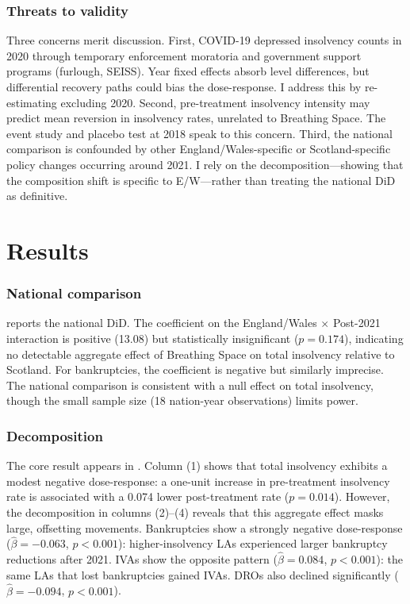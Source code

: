 \documentclass[12pt]{article}
\begin{document}
\subsubsection*{Threats to validity} Three concerns merit discussion. First, COVID-19 depressed insolvency counts in 2020 through temporary enforcement moratoria and government support programs (furlough, SEISS). Year fixed effects absorb level differences, but differential recovery paths could bias the dose-response. I address this by re-estimating excluding 2020. Second, pre-treatment insolvency intensity may predict mean reversion in insolvency rates, unrelated to Breathing Space. The event study and placebo test at 2018 speak to this concern. Third, the national comparison is confounded by other England/Wales-specific or Scotland-specific policy changes occurring around 2021. I rely on the decomposition---showing that the composition shift is specific to E/W---rather than treating the national DiD as definitive.

\section{Results}



\subsubsection*{National comparison}  reports the national DiD. The coefficient on the England/Wales $\times$ Post-2021 interaction is positive (13.08) but statistically insignificant ($p = 0.174$), indicating no detectable aggregate effect of Breathing Space on total insolvency relative to Scotland. For bankruptcies, the coefficient is negative but similarly imprecise. The national comparison is consistent with a null effect on total insolvency, though the small sample size (18 nation-year observations) limits power.



\subsubsection*{Decomposition} The core result appears in . Column (1) shows that total insolvency exhibits a modest negative dose-response: a one-unit increase in pre-treatment insolvency rate is associated with a 0.074 lower post-treatment rate ($p = 0.014$). However, the decomposition in columns (2)--(4) reveals that this aggregate effect masks large, offsetting movements. Bankruptcies show a strongly negative dose-response ($\hat{\beta} = -0.063$, $p < 0.001$): higher-insolvency LAs experienced larger bankruptcy reductions after 2021. IVAs show the opposite pattern ($\hat{\beta} = 0.084$, $p < 0.001$): the same LAs that lost bankruptcies gained IVAs. DROs also declined significantly ($\hat{\beta} = -0.094$, $p < 0.001$).
\end{document}
